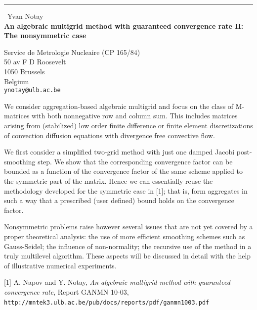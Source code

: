 \documentclass{report}
\begin{document}
\begin{center}
\rule{6in}{1pt} \
{\large Yvan Notay \\
{\bf An algebraic multigrid method with guaranteed convergence rate II: The nonsymmetric case}}

Service de Metrologie Nucleaire (CP 165/84) \\ 50 av F D Roosevelt \\ 1050 Brussels \\ Belgium
\\
{\tt ynotay@ulb.ac.be}\end{center}

We consider aggregation-based algebraic multigrid
and focus on the class of
M-matrices with both nonnegative row and column sum. This includes matrices
arising from (stabilized) low order finite difference or finite element
discretizations of convection diffusion equations with divergence free
convective flow.

We first consider a simplified two-grid method with just one damped Jacobi
post-smoothing step. We show that the corresponding convergence factor
can be bounded as a function of the convergence factor of the same scheme
applied to the symmetric part of the matrix.
Hence we can essentially reuse the methodology developed for the symmetric
case in
[1]; that is, form aggregates
in such a way that a prescribed (user defined) bound holds on
the convergence factor.

Nonsymmetric problems raise however several issues that are not yet
covered by a proper
theoretical analysis: the use of more efficient smoothing schemes such as Gauss-Seidel;
the influence of non-normality;
the recursive use of the method in a truly multilevel algorithm.
These aspects will be discussed in detail with the help of illustrative
numerical experiments.


[1] A. Napov and Y. Notay, {\em An algebraic multigrid method with
guaranteed convergence rate},
Report GANMN 10-03, \verb+http://mntek3.ulb.ac.be/pub/docs/reports/pdf/ganmn1003.pdf+\,
\end{document}
